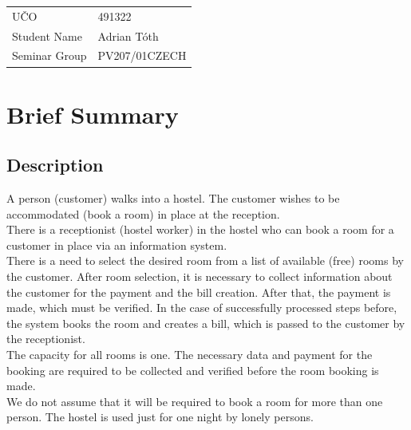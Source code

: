 \documentclass[11pt,a4paper]{article}
\begin{document}
\begin{center}
    \begin{tabular}{l|l}
        UČO           & 491322        \\
        Student Name  & Adrian Tóth   \\
        Seminar Group & PV207/01CZECH \\
    \end{tabular}
\end{center}

\section{Brief Summary}

    \subsection{Description}

        \begin{adjustwidth}{2.5cm}{2.5cm}

            \noindent A person (customer) walks into a hostel. The customer wishes to be accommodated (book a room) in place at the reception.\\

            \noindent There is a receptionist (hostel worker) in the hostel who can book a room for a customer in place via an information system.\\

            \noindent There is a need to select the desired room from a list of available (free) rooms by the customer. After room selection, it is necessary to collect information about the customer for the payment and the bill creation. After that, the payment is made, which must be verified. In the case of successfully processed steps before, the system books the room and creates a bill, which is passed to the customer by the receptionist.\\

            \noindent The capacity for all rooms is one. The necessary data and payment for the booking are required to be collected and verified before the room booking is made.\\

            \noindent We do not assume that it will be required to book a room for more than one person. The hostel is used just for one night by lonely persons.
        \end{adjustwidth}

\newpage


\end{document}
